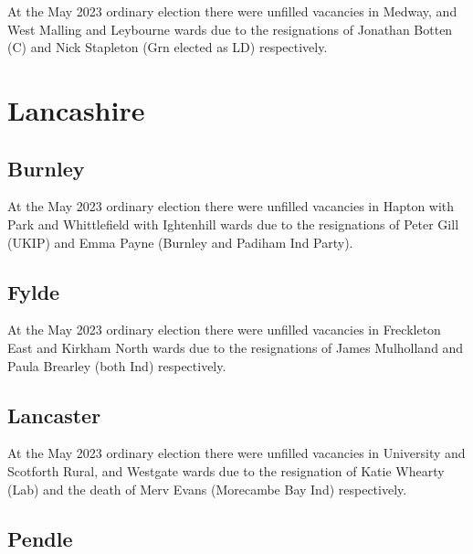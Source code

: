 \documentclass[a4paper,openany]{book}
\begin{document}
\begin{resultsiii}
At the May 2023 ordinary election there were unfilled vacancies in Medway, and West Malling and Leybourne wards due to the resignations of Jonathan Botten (C) and Nick Stapleton (Grn elected as LD) respectively.%
%

\section{Lancashire}

\subsection*{Burnley}

At the May 2023 ordinary election there were unfilled vacancies in Hapton with Park and Whittlefield with Ightenhill wards due to the resignations of Peter Gill (UKIP) and Emma Payne (Burnley and Padiham Ind Party).%
%

\subsection*{Fylde}

At the May 2023 ordinary election there were unfilled vacancies in Freckleton East and Kirkham North wards due to the resignations of James Mulholland and Paula Brearley (both Ind) respectively.%
%

\subsection*{Lancaster}

At the May 2023 ordinary election there were unfilled vacancies in University and Scotforth Rural, and Westgate wards due to the resignation of Katie Whearty (Lab) and the death of Merv Evans (Morecambe Bay Ind) respectively.%
%

\subsection*{Pendle}


\end{resultsiii}
\end{document}

